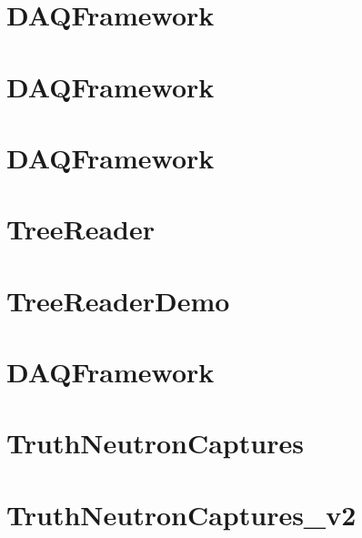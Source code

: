 \let\mypdfximage\pdfximage\def\pdfximage{\immediate\mypdfximage}\documentclass[twoside]{book}
\newcommand{\+}{\discretionary{\mbox{\scriptsize$\hookleftarrow$}}{}{}}
\begin{document}
\chapter{DAQFramework}
\label{md_UserTools_SplitAtmosInteractions_README}

\chapter{DAQFramework}
\label{md_UserTools_template_README}

\chapter{DAQFramework}
\label{md_UserTools_TestTool_README}

\chapter{Tree\+Reader}
\label{md_UserTools_TreeReader_README}

\chapter{Tree\+Reader\+Demo}
\label{md_UserTools_TreeReaderDemo_README}

\chapter{DAQFramework}
\label{md_UserTools_TrueNCaptures_README}

\chapter{Truth\+Neutron\+Captures}
\label{md_UserTools_TruthNeutronCaptures_README}

\chapter{Truth\+Neutron\+Captures\+\_\+v2}
\label{md_UserTools_TruthNeutronCaptures_v2_README}

\end{document}
